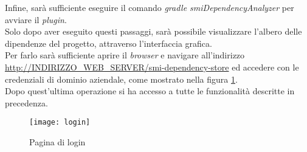 Infine, sarà sufficiente eseguire il comando \textit{gradle smiDependencyAnalyzer} per avviare il \textit{plugin}.\\
Solo dopo aver eseguito questi passaggi, sarà possibile visualizzare l'albero delle dipendenze del progetto,
attraverso l'interfaccia grafica. \\
Per farlo sarà sufficiente aprire il \textit{browser} e navigare all'indirizzo \url{http://INDIRIZZO_WEB_SERVER/smi-dependency-store}
ed accedere con le credenziali di dominio aziendale, come mostrato nella figura \ref*{fig:login}.\\
Dopo quest'ultima operazione si ha accesso a tutte le funzionalità descritte in precedenza.

\begin{figure}[!h]
  \centering
  \texttt{[image: login]}
  \caption{Pagina di login}
  \label{fig:login}
\end{figure}

